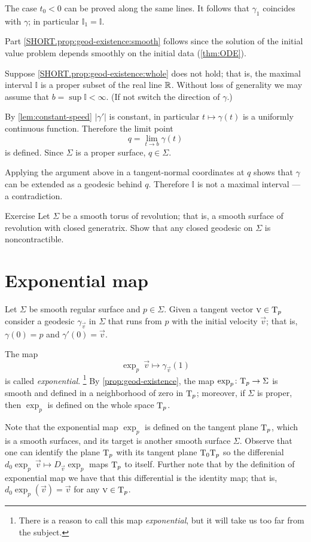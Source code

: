 The case $t_0<0$ can be proved along the same lines.
It follows that $\gamma_1$ coincides with $\gamma$;
in particular $\mathbb{I}_1=\mathbb{I}$.

Part \ref{SHORT.prop:geod-existence:smooth} follows since the solution of the initial value problem depends smoothly on the initial data (\ref{thm:ODE}).

Suppose \ref{SHORT.prop:geod-existence:whole} does not hold;
that is, the maximal interval $\mathbb{I}$ is a proper subset of the real line $\mathbb{R}$.
Without loss of generality we may assume that $b=\sup\mathbb{I}<\infty$.
(If not switch the direction of $\gamma$.)

By \ref{lem:constant-speed} $|\gamma'|$ is constant, in particular $t\mapsto \gamma(t)$ is a uniformly continuous function.
Therefore  the limit point
\[q=\lim_{t\to b}\gamma(t)\] 
is defined.
Since $\Sigma$ is a proper surface, $q\in \Sigma$. 

Applying the argument above in a tangent-normal coordinates at $q$ shows that $\gamma$ can be extended as a geodesic behind $q$.
Therefore $\mathbb{I}$ is not a maximal interval --- a contradiction.
\qeds

\begin{thm}{Exercise}\label{ex:round-torus}
Let $\Sigma$ be a smooth torus of revolution; that is,
a smooth surface of revolution with closed generatrix.
Show that any closed geodesic on $\Sigma$ is noncontractible.
\end{thm}

\section{Exponential map}\label{sec:exp}

Let $\Sigma$ be smooth regular surface and $p\in \Sigma$.
Given a tangent vector ${\textsc v}\in \mathrm{T}_p$ consider a geodesic $\gamma_{\vec v}$ in $\Sigma$ that runs from $p$ with the initial velocity ${\vec v}$;  
that is, $\gamma(0)=p$ and $\gamma'(0)={\vec v}$.

The map 
\[\exp_p\:\vec v\mapsto \gamma_{\vec v}(1)\]
is called \emph{exponential}.%
\footnote{There is a reason to call this map {}\emph{exponential}, but it will take us too far from the subject.}
By \ref{prop:geod-existence}, the map $\exp_p\colon\mathrm{T}_p\to \Sigma$ is smooth and defined in a neighborhood of zero in $\mathrm{T}_p$;
moreover, if $\Sigma$ is proper, then $\exp_p$ is defined on the whole space $\mathrm{T}_p$.

Note that the exponential map $\exp_p$ 
is defined on the tangent plane $\mathrm{T}_p$, which is a smooth surfaces,
and its target is another smooth surface $\Sigma$.
Observe that one can identify the plane $\mathrm{T}_p$
with its tangent plane $\mathrm{T}_0\mathrm{T}_p$ so the differenial $d_0\exp_p\:\vec v\mapsto D_{\vec v}\exp_p$ maps $\mathrm{T}_p$ to itself.
Further note that by the definition of exponential map we have that this differential is the identity map; that is, $d_0\exp_p(\vec v)=
\vec v$ for any $\textsc v\in \mathrm{T}_p$.

